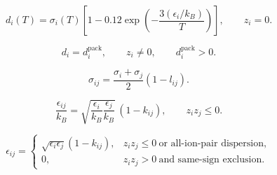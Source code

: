 \documentclass[11pt]{article}
\begin{document}
\begin{equation}
d_i(T)=\sigma_i(T)\left[1-0.12\exp\left(-\frac{3(\epsilon_i/k_B)}{T}\right)\right],
\qquad z_i=0.
\label{eq:neutral_segment_diameter}
\end{equation}

\begin{equation}
d_i=d_i^{\mathrm{pack}},\qquad z_i\ne0,\qquad d_i^{\mathrm{pack}}>0.
\label{eq:ionic_packing_diameter}
\end{equation}

\begin{equation}
\sigma_{ij}=\frac{\sigma_i+\sigma_j}{2}(1-l_{ij}).
\label{eq:cross_segment_diameter}
\end{equation}

\begin{equation}
\frac{\epsilon_{ij}}{k_B}
=\sqrt{\frac{\epsilon_i}{k_B}\frac{\epsilon_j}{k_B}}\,(1-k_{ij}),
\qquad z_iz_j\le0.
\label{eq:cross_dispersion_energy}
\end{equation}

\begin{equation}
\epsilon_{ij}=\begin{cases}\sqrt{\epsilon_i\epsilon_j}(1-k_{ij}),&z_iz_j\leq 0\ \text{or all-ion-pair dispersion},\\0,&z_iz_j>0\ \text{and same-sign exclusion}.\end{cases}
\label{eq:same_sign_ionic_dispersion}
\end{equation}
\end{document}
